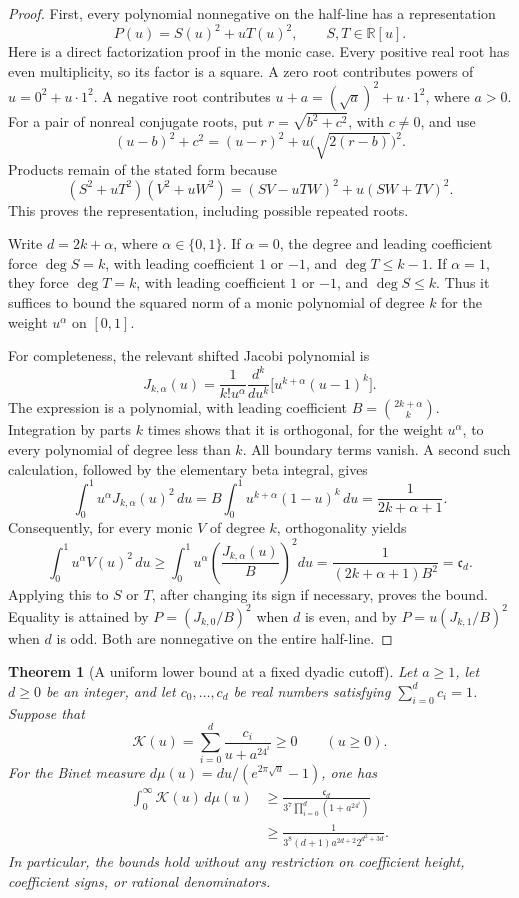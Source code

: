 \documentclass[11pt,a4paper]{article}
\newtheorem{theorem}{Theorem}[section]
\theoremstyle{definition}
\theoremstyle{remark}
\begin{document}
\begin{proof}
First, every polynomial nonnegative on the half-line has a representation
\[
 P(u)=S(u)^2+uT(u)^2,\qquad S,T\in\mathbb R[u].
\]
Here is a direct factorization proof in the monic case.  Every positive
real root has even multiplicity, so its factor is a square.  A zero root
contributes powers of $u=0^2+u\cdot1^2$.  A negative root contributes
$u+a=(\sqrt a)^2+u\cdot1^2$, where $a>0$.  For a pair of nonreal
conjugate roots, put $r=\sqrt{b^2+c^2}$, with $c\ne0$, and use
\[
 (u-b)^2+c^2=(u-r)^2+u\bigl(\sqrt{2(r-b)}\bigr)^2.
\]
Products remain of the stated form because
\[
 (S^2+uT^2)(V^2+uW^2)
   =(SV-uTW)^2+u(SW+TV)^2.
\]
This proves the representation, including possible repeated roots.

Write $d=2k+\alpha$, where $\alpha\in\{0,1\}$.  If $\alpha=0$,
the degree and leading coefficient force $\deg S=k$, with leading
coefficient $1$ or $-1$, and $\deg T\le k-1$.  If $\alpha=1$,
they force $\deg T=k$, with leading coefficient $1$ or $-1$, and
$\deg S\le k$.  Thus it suffices to bound the squared norm of a monic
polynomial of degree $k$ for the weight $u^\alpha$ on $[0,1]$.

For completeness, the relevant shifted Jacobi polynomial is
\[
 J_{k,\alpha}(u)=
 \frac{1}{k!u^\alpha}\frac{d^k}{du^k}
       \bigl[u^{k+\alpha}(u-1)^k\bigr].
\]
The expression is a polynomial, with leading coefficient
$B=\binom{2k+\alpha}{k}$.  Integration by parts $k$ times shows
that it is orthogonal, for the weight $u^\alpha$, to every polynomial
of degree less than $k$.  All boundary terms vanish.  A second such
calculation, followed by the elementary beta integral, gives
\[
 \int_0^1 u^\alpha J_{k,\alpha}(u)^2\,du
 =B\int_0^1u^{k+\alpha}(1-u)^k\,du
 =\frac{1}{2k+\alpha+1}.
\]
Consequently, for every monic $V$ of degree $k$, orthogonality yields
\[
 \int_0^1u^\alpha V(u)^2\,du
 \ge \int_0^1u^\alpha\left(\frac{J_{k,\alpha}(u)}B\right)^2du
 =\frac{1}{(2k+\alpha+1)B^2}=\mathfrak c_d.
\]
Applying this to $S$ or $T$, after changing its sign if necessary,
proves the bound.  Equality is attained by
$P=(J_{k,0}/B)^2$ when $d$ is even, and by
$P=u(J_{k,1}/B)^2$ when $d$ is odd.  Both are nonnegative on the
entire half-line.
\end{proof}

\begin{theorem}[A uniform lower bound at a fixed dyadic cutoff]
\label{unified-degree-cutoff}
Let $a\ge1$, let $d\ge0$ be an integer, and let $c_0,\ldots,c_d$ be
real numbers satisfying $\sum_{i=0}^d c_i=1$.  Suppose that
\[
 \mathcal K(u)=\sum_{i=0}^d\frac{c_i}{u+a^24^i}\ge0
 \qquad(u\ge0).
\]
For the Binet measure $d\mu(u)=du/(e^{2\pi\sqrt u}-1)$, one has
\begin{align}
 \int_0^\infty\mathcal K(u)\,d\mu(u)
 &\ge
 \frac{\mathfrak c_d}{3^7\prod_{i=0}^d(1+a^24^i)}
 \label{unified-degree-product-bound}\\
 &\ge
 \frac{1}{3^8(d+1)a^{2d+2}2^{d^2+3d}}.
 \label{unified-degree-elementary-bound}
\end{align}
In particular, the bounds hold without any restriction on coefficient
height, coefficient signs, or rational denominators.
\end{theorem}
\end{document}
